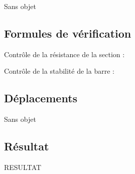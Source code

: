 Sans objet

\subsection{Formules de vérification}

Contrôle de la résistance de la section :

Contrôle de la stabilité de la barre :

\subsection{Déplacements}

Sans objet

\subsection{Résultat}

RESULTAT

